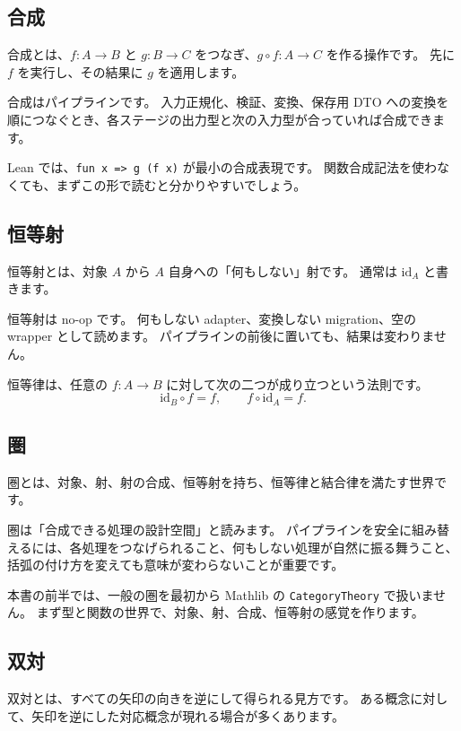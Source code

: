 \subsection{合成}

合成とは、\(f : A \to B\) と \(g : B \to C\) をつなぎ、\(g \circ f : A \to C\) を作る操作です。
先に \(f\) を実行し、その結果に \(g\) を適用します。

合成はパイプラインです。
入力正規化、検証、変換、保存用 DTO への変換を順につなぐとき、各ステージの出力型と次の入力型が合っていれば合成できます。

Lean では、\texttt{fun x => g (f x)} が最小の合成表現です。
関数合成記法を使わなくても、まずこの形で読むと分かりやすいでしょう。

\subsection{恒等射}

恒等射とは、対象 \(A\) から \(A\) 自身への「何もしない」射です。
通常は \(\mathrm{id}_A\) と書きます。

恒等射は no-op です。
何もしない adapter、変換しない migration、空の wrapper として読めます。
パイプラインの前後に置いても、結果は変わりません。

恒等律は、任意の \(f : A \to B\) に対して次の二つが成り立つという法則です。
\[
\mathrm{id}_B \circ f = f, \qquad f \circ \mathrm{id}_A = f.
\]

\subsection{圏}

圏とは、対象、射、射の合成、恒等射を持ち、恒等律と結合律を満たす世界です。

圏は「合成できる処理の設計空間」と読みます。
パイプラインを安全に組み替えるには、各処理をつなげられること、何もしない処理が自然に振る舞うこと、括弧の付け方を変えても意味が変わらないことが重要です。

本書の前半では、一般の圏を最初から Mathlib の \texttt{CategoryTheory} で扱いません。
まず型と関数の世界で、対象、射、合成、恒等射の感覚を作ります。

\subsection{双対}

双対とは、すべての矢印の向きを逆にして得られる見方です。
ある概念に対して、矢印を逆にした対応概念が現れる場合が多くあります。

